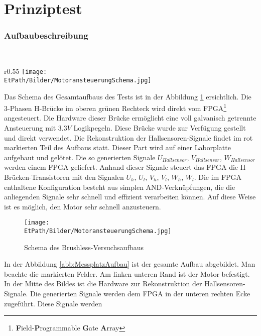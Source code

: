 \ifSTANDALONE
\section{Prinziptest}
\fi
\ifEMBED
\subsubsection{Aufbaubeschreibung}
    \BLDCcollab \\
\fi
\ifEMBED
    \begin{wrapfigure}{r}{0.55\textwidth}
       	\texttt{[image: \\EtPath/Bilder/MotoransteuerungSchema.jpg]}
       	\centering
       	\caption{Schema des Brushless-Versuchsaufbaus}
        \label{abb:MotoransteuerungSchema}
    \end{wrapfigure}
\fi
    Das Schema des Gesamtaufbaus des Tests ist in der Abbildung 
    \ref{abb:MotoransteuerungSchema} ersichtlich. Die 3-Phasen H-Brücke im 
    oberen grünen Rechteck wird direkt vom FPGA\footnote
    {\textbf{F}ield-\textbf{P}rogrammable \textbf{G}ate 
    \textbf{A}rray} angesteuert. Die Hardware dieser Brücke ermöglicht eine 
    voll galvanisch getrennte Ansteuerung mit $3.3 V$ Logikpegeln. Diese 
    Brücke wurde zur Verfügung gestellt und direkt verwendet. Die 
    Rekonstruktion der Hallsensoren-Signale findet im rot markierten Teil des 
    Aufbaus statt. Dieser Part wird auf einer Laborplatte aufgebaut und 
    gelötet. Die so generierten Signale $U_{Hallsensor}$, $V_{Hallsensor}$, 
    $W_{Hallsensor}$ werden einem FPGA geliefert. Anhand dieser Signale 
    steuert das FPGA die H-Brücken-Transistoren mit den Signalen $U_h$, $U_l$, 
    $V_h$, $V_l$, $W_h$, $W_l$. Die im FPGA enthaltene Konfiguration besteht 
    aus simplen AND-Verknüpfungen, die die anliegenden Signale sehr schnell 
    und effizient verarbeiten können. Auf diese Weise ist es möglich, den 
    Motor sehr schnell anzusteuern.
    \ifSTANDALONE
    \begin{figure}[h!]
    	\texttt{[image: \\EtPath/Bilder/MotoransteuerungSchema.jpg]}
       	\centering
       	\caption{Schema des Brushless-Versuchsaufbaus}
        \label{abb:MotoransteuerungSchema}
    \end{figure}
    \fi
    In der Abbildung \ref{abb:MessplatzAufbau} ist der gesamte Aufbau 
    abgebildet. Man beachte die markierten Felder. Am linken unteren Rand ist 
    der Motor befestigt. In der Mitte des Bildes ist die Hardware zur 
    Rekonstruktion der Hallsensoren-Signale.  Die generierten Signale werden 
    dem FPGA in der unteren rechten Ecke zugeführt. Diese Signale werden 
